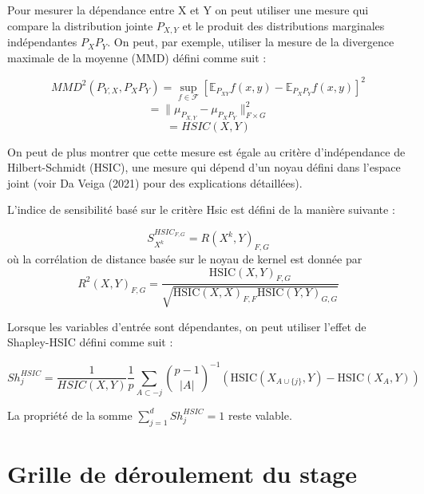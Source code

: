 \documentclass[
]{article}
\begin{document}
Pour mesurer la dépendance entre X et Y on peut utiliser une mesure qui
compare la distribution jointe \(P_{X,Y}\) et le produit des
distributions marginales indépendantes \(P_XP_Y\). On peut, par exemple,
utiliser la mesure de la divergence maximale de la moyenne (MMD) défini
comme suit :

\[MMD^2(P_{Y,X},P_XP_Y)=\sup_{f \in \mathcal{F}} \left[ \mathbb{E}_{P_{XY}} f (x, y) - \mathbb{E}_{P_X P_Y} f (x, y) \right]^2 \]
\[=\lVert\mu_{P_{X,Y}} - \mu_{P_X P_Y}\rVert^2_{F\times G}\]
\[=HSIC(X,Y)\]

On peut de plus montrer que cette mesure est égale au critère
d'indépendance de Hilbert-Schmidt (HSIC), une mesure qui dépend d'un
noyau défini dans l'espace joint (voir Da Veiga (2021) pour des
explications détaillées).

L'indice de sensibilité basé sur le critère Hsic est défini de la
manière suivante :

\[ S^{HSIC_{F,G}}_{X^k} = R(X^k, Y)_{F,G}  \] où la corrélation de
distance basée sur le noyau de kernel est donnée par
\[ R^2(X, Y)_{F,G} = \frac{\text{HSIC}(X, Y)_{F,G}}{\sqrt{\text{HSIC}(X, X)_{F,F} \text{HSIC}(Y, Y)_{G,G}}} \]

Lorsque les variables d'entrée sont dépendantes, on peut utiliser
l'effet de Shapley-HSIC défini comme suit :

\[ Sh^{HSIC}_j =\frac{1}{HSIC(X,Y)} \frac{1}{p} \sum_{A \subset -j} {{p-1 \choose |A|}}^{-1} ( \text{HSIC}(X_{A \cup \{j\}}, Y) - \text{HSIC}(X_A, Y) ) \]

La propriété de la somme \(\sum_{j=1}^{d} Sh^{HSIC}_j = 1\) reste
valable.

\hypertarget{grille-de-duxe9roulement-du-stage}{%
\section{Grille de déroulement du
stage}\label{grille-de-duxe9roulement-du-stage}}
\end{document}
